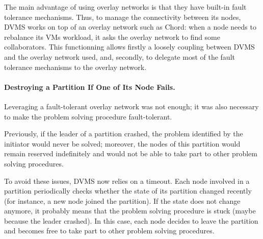 The main advantage of using overlay networks is that they have built-in fault
tolerance mechanisms. Thus, to manage the connectivity between its nodes, DVMS
works on top of an overlay network such as Chord: when a node needs to rebalance
its VMs workload, it asks the overlay network to find some collaborators. This
functionning allows firstly a loosely coupling between DVMS and the overlay
network used, and, secondly, to delegate most of the fault tolerance mechanisms
to the overlay network.


\paragraph{Destroying a Partition If One of Its Node Fails.}

Leveraging a fault-tolerant overlay network was not enough; it was also necessary to make the
problem solving procedure fault-tolerant.

Previously, if the leader of a partition crashed, the problem identified by the
initiator would never be solved; moreover, the nodes of this partition would
remain reserved indefinitely and would not be able to take part to other problem
solving procedures.

To avoid these issues, DVMS now relies on a timeout.  Each node involved in a
partition periodically checks whether the state of its partition changed
recently (for instance, a new node joined the partition).
%
If the state does not change anymore, it probably means that the problem solving
procedure is stuck (maybe because the leader crashed).
%
In this case, each node decides to leave the partition and becomes free to take
part to other problem solving procedures.
